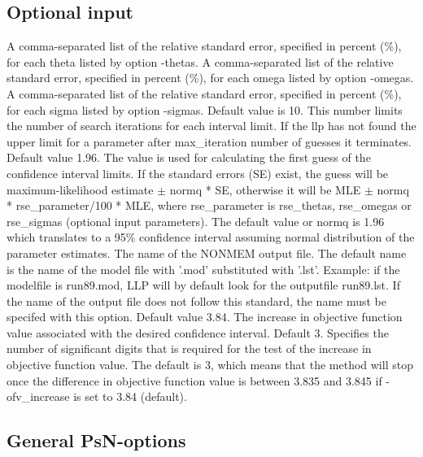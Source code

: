 \subsection{Optional input}

\begin{optionlist}
A comma-separated list of the relative standard error, specified in percent (\%), for each theta listed by option -thetas. 
\nextopt
{}
A comma-separated list of the relative standard error, specified in percent (\%), for each omega listed by option -omegas. 
\nextopt
{}
A comma-separated list of the relative standard error, specified in percent (\%), for each sigma listed by option -sigmas. 
\nextopt
{}
Default value is 10. This number limits the number of search iterations for each interval limit. If the llp has not found the upper limit for a parameter after max\_iteration number of guesses it terminates. 
\nextopt
{}
Default value 1.96. The value is used for calculating the first guess of the confidence interval limits. If the standard errors (SE) exist, the guess will be maximum-likelihood estimate $\pm$ normq * SE, otherwise it will be MLE $\pm$ normq * rse\_parameter/100 * MLE, where rse\_parameter is rse\_thetas, rse\_omegas or rse\_sigmas (optional input parameters). The default value or normq is 1.96 which translates to a 95\% confidence interval assuming normal distribution of the parameter estimates. 
\nextopt
{}
The name of the NONMEM output file. The default name is the name of the model file with '.mod' substituted with '.lst'. Example: if the modelfile is run89.mod, LLP will by default look for the outputfile run89.lst. If the name of the output file does not follow this standard, the name must be specifed with this option. 
\nextopt
{}
Default value 3.84. The increase in objective function value associated with the desired confidence interval. 
\nextopt
{}
Default 3. Specifies the number of significant digits that is required for the test of the increase in objective function value. The default is 3, which means that the method will stop once the difference in objective function value is between 3.835 and 3.845 if -ofv\_increase is set to 3.84 (default). 
\nextopt
\end{optionlist}

\subsection{General PsN-options}

